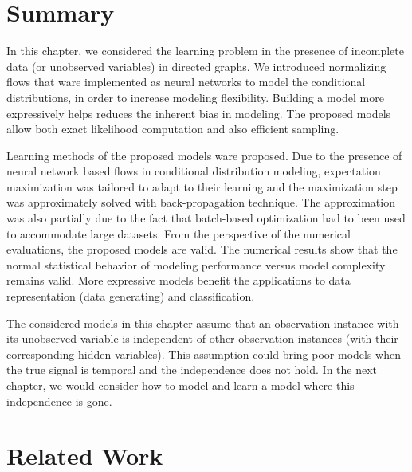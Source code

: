 \section{Summary}
In this chapter, we considered the learning problem in the presence of incomplete data (or unobserved variables) in directed graphs. We introduced normalizing flows that ware implemented as neural networks to model the conditional distributions, in order to increase modeling flexibility. Building a model more expressively helps reduces the inherent bias in modeling. The proposed models allow both exact likelihood computation and also efficient sampling.

Learning methods of the proposed models ware proposed. Due to the presence of neural network based flows in conditional distribution modeling, expectation maximization was tailored to adapt to their learning and the maximization step was approximately solved with back-propagation technique. The approximation was also partially due to the fact that batch-based optimization had to been used to accommodate large datasets. From the perspective of the numerical evaluations, the proposed models are valid. The numerical results show that the normal statistical behavior of modeling performance versus model complexity remains valid. More expressive models benefit the applications to data representation (data generating) and classification.

The considered models in this chapter assume that an observation instance with its unobserved variable is independent of other observation instances (with their corresponding hidden variables). This assumption could bring poor models when the true signal is temporal and the independence does not hold. In the next chapter, we would consider how to model and learn a model where this independence is gone. 

\section{Related Work}

